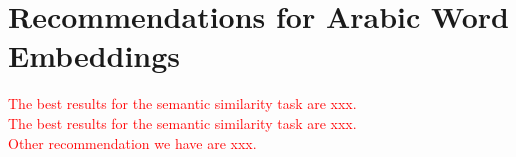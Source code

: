 \section{Recommendations for Arabic Word Embeddings}


\textcolor{red}{The best results for the semantic similarity task are xxx.}
\\
\textcolor{red}{The best results for the semantic similarity task are xxx.}
\\
\textcolor{red}{Other recommendation we have are xxx.}
